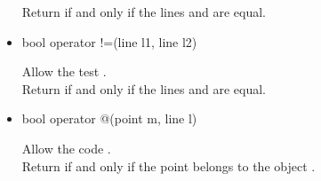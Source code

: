 \documentclass[pdftex]{article}
\begin{document}
\begin{itemize}
  Return  if and only if the lines  and 
  are equal.
\item {}%
  \begin{Vcolor}
    bool operator !=(line l1, line l2)
  \end{Vcolor}
  Allow the test .\\
  Return  if and only if the lines 
  and  are equal.
\item {}%
  \begin{Vcolor}
    bool operator @(point m, line l)
  \end{Vcolor}
  Allow the code .\\
  Return  if and only if the point  belongs to the
  object .
\end{itemize}
\end{document}
